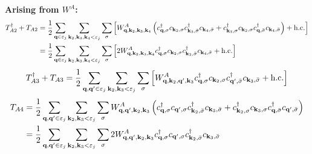 \documentclass{revtex4-2}
\begin{document}
{\bf Arising from \(W^A\):}
\begin{equation}\begin{aligned}
	T_{A2}^\dagger + T_{A2} &= \frac{1}{2}\sum_{{\bf q} \in \varepsilon_j}\sum_{{\bf k}_2, {\bf k}_3, {\bf k}_4 < \varepsilon_j}\sum_{\sigma} \left[W^A_{{\bf q},{\bf k}_2,{\bf k}_3,{\bf k}_4}\left(c^\dagger_{{\bf q},\sigma}c_{{\bf k}_2,\sigma}c^\dagger_{{\bf k}_3,\bar\sigma}c_{{\bf k}_4,\bar\sigma} + c^\dagger_{{\bf k}_3,\sigma}c_{{\bf k}_2,\sigma}c^\dagger_{{\bf q},\bar\sigma}c_{{\bf k}_4,\bar\sigma}\right) + \text{h.c.}\right]\\
				&= \frac{1}{2}\sum_{{\bf q} \in \varepsilon_j}\sum_{{\bf k}_2, {\bf k}_3, {\bf k}_4 < \varepsilon_j}\sum_{\sigma} \left[2W^A_{{\bf q},{\bf k}_2,{\bf k}_3,{\bf k}_4}c^\dagger_{{\bf q},\sigma}c_{{\bf k}_2,\sigma}c^\dagger_{{\bf k}_3,\bar\sigma}c_{{\bf k}_4,\bar\sigma} + \text{h.c.}\right]\\
\end{aligned}\end{equation}
\begin{equation}\begin{aligned}
	T_{A3}^\dagger + T_{A3} &= \frac{1}{2}\sum_{{\bf q}, {\bf q}^\prime \in \varepsilon_j}\sum_{{\bf k}_2, {\bf k}_3 < \varepsilon_j}\sum_{\sigma} \left[W^A_{{\bf q},{\bf k}_2, {\bf q}^\prime, {\bf k}_3}c^\dagger_{{\bf q},\sigma}c_{{\bf k}_2,\sigma}c^\dagger_{{\bf q}^\prime,\bar\sigma}c_{{\bf k}_3,\bar\sigma} + \text{h.c.}\right]\\
\end{aligned}\end{equation}
\begin{equation}\begin{aligned}
	T_{A4} &= \frac{1}{2}\sum_{{\bf q}, {\bf q}^\prime \in \varepsilon_j}\sum_{{\bf k}_2, {\bf k}_3 < \varepsilon_j}\sum_{\sigma}W^A_{{\bf q},{\bf q}^\prime,{\bf k}_2,{\bf k}_3} \left(c^\dagger_{{\bf q},\sigma}c_{{\bf q}^\prime,\sigma}c^\dagger_{{\bf k}_2,\bar\sigma}c_{{\bf k}_3,\bar\sigma} + c^\dagger_{{\bf k}_2,\sigma}c_{{\bf k}_3,\sigma}c^\dagger_{{\bf q},\bar\sigma}c_{{\bf q}^\prime,\bar\sigma}\right)\\
				&= \frac{1}{2}\sum_{{\bf q}, {\bf q}^\prime \in \varepsilon_j}\sum_{{\bf k}_2, {\bf k}_3 < \varepsilon_j}\sum_{\sigma}2W^A_{{\bf q},{\bf q}^\prime,{\bf k}_2,{\bf k}_3} c^\dagger_{{\bf q},\sigma}c_{{\bf q}^\prime,\sigma}c^\dagger_{{\bf k}_2,\bar\sigma}c_{{\bf k}_3,\bar\sigma}\\
\end{aligned}\end{equation}
\end{document}

